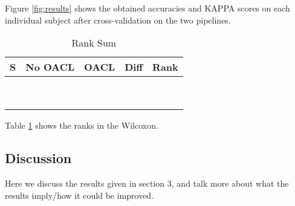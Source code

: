 Figure \ref{fig:results} shows the obtained accuracies and KAPPA scores on each individual subject after cross-validation on the two pipelines.
\begin{table}[H]
	\centering
	\caption{Rank Sum}
	\label{fig:wilcoxon}
	\begin{tabular}{@{}l|llll@{}}
		\toprule
		S & No OACL & OACL & Diff & Rank \\ \midrule
		&               &                 &      &      \\
		&               &                 &      &      \\
		&               &                 &      &      \\
		&               &                 &      &      \\
		&               &                 &      &      \\
		&               &                 &      &      \\
		&               &                 &      &      \\
		&               &                 &      &      \\
		&               &                 &      &      \\ \bottomrule
	\end{tabular}
\end{table}
Table \ref{fig:wilcoxon} shows the ranks in the Wilcoxon. 
\subsection{Discussion}
Here we discuss the results given in section 3, and talk more about what the results imply/how it could be improved.